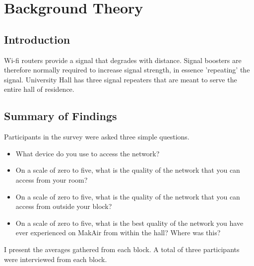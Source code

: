
\chapter{Background Theory}

\label{ch:background}

\section{Introduction}

Wi-fi routers provide a signal that degrades with distance. Signal boosters are therefore normally required to increase signal strength, in essence 'repeating' the signal.
University Hall has three signal repeaters that are meant to serve the entire hall of residence.

\section{Summary of Findings}
Participants in the survey were asked three simple questions.
\begin{itemize}
    \item What device do you use to access the network?
    \item On a scale of zero to five, what is the quality of the network that you can access from your room?
    \item On a scale of zero to five, what is the quality of the network that you can access from outside your block?
    \item On a scale of zero to five, what is the best quality of the network you have ever experienced on MakAir from within the hall? Where was this?
\end{itemize}

I present the averages gathered from each block. A total of three participants were interviewed from each block.

